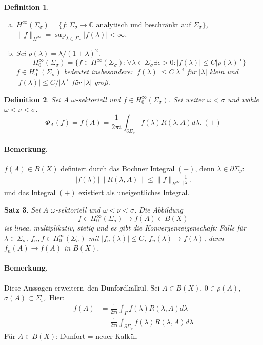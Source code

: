 \documentclass[12pt]{extreport} %
\newtheorem{Satz}{Satz}[subsection]
\newtheorem{Definition}[Satz]{Definition}
\numberwithin{equation}{section}
\newcommand{\C}{\mathbb{C}} %
\newcommand{\om}{\omega}
\begin{document}
	\begin{Definition}
		~
		\begin{enumerate}[a)]
			\item $H^{\infty}(\Sigma_\sigma) = \{f\colon \Sigma_\sigma\rightarrow \C \text{ analytisch und beschränkt auf }\Sigma_\sigma \}$, $\|f\|_{H^\infty} = \sup_{\lambda\in \Sigma_\sigma} |f(\lambda)| <\infty$.
			\item Sei $\rho(\lambda) = \lambda/(1+\lambda)^2$. 
			$$H_0^\infty(\Sigma_\sigma) = \{f\in H^\infty(\Sigma_\sigma)\colon \forall \lambda \in \Sigma_\sigma \exists \epsilon >0\colon |f(\lambda)|\leq C|\rho(\lambda)|^\epsilon \}$$
			$f\in H_0^\infty(\Sigma_\sigma)$ bedeutet insbesondere:
			$|f(\lambda)|\leq C|\lambda|^\epsilon$ für $|\lambda|$ klein und $|f(\lambda)|\leq C/|\lambda|^\epsilon$ für $|\lambda|$ groß.
		\end{enumerate}
	\end{Definition}
	
	\begin{Definition}
		Sei $A$ $\om$-sektoriell und $f\in H_0^\infty(\Sigma_\sigma)$. Sei weiter $\om < \sigma$ und wähle $\om<\nu<\sigma$.
		$$\Phi_A(f) = f(A) = \frac{1}{2\pi i}\int_{\partial \Sigma_\nu} f(\lambda) R(\lambda,A) d\lambda. ~ (+)$$
	\end{Definition}
	
	\paragraph{Bemerkung.} $f(A)\in B(X)$ definiert durch das Bochner Integral $(+)$, denn $\lambda\in \partial \Sigma_\nu$: 
	\begin{align*}
		|f(\lambda)| \|R(\lambda, A)\|\leq \|f\|_{H^{\infty}} \frac{1}{|\lambda|}.
	\end{align*}
	und das Integral $(+)$ existiert als uneigentliches Integral.
	
	\begin{Satz}
		Sei $A$ $\om$-sektoriell und $\om<\nu<\sigma$. Die Abbildung 
		$$f\in H_0^{\infty}(\Sigma_\sigma)\rightarrow f(A)\in B(X)$$ ist linea, multiplikativ, stetig und es gibt die Konvergenzeigenschaft: Falls für $\lambda\in \Sigma_\sigma$, $f_n,f\in H_0^{\infty}(\Sigma_\sigma)$ mit $|f_n(\lambda)|\leq C$, $f_n(\lambda)\rightarrow f(\lambda)$, dann $f_n(A)\rightarrow f(A)$ in $B(X)$.
	\end{Satz}
	
	\paragraph{Bemerkung.} Diese Aussagen \glqq erweitern\grqq\ den Dunfordkalkül. Sei $A\in B(X)$, $0\in \rho(A)$, $\sigma(A)\subset \Sigma_\om$. Hier:
	\begin{align*}
		f(A) &=\frac{1}{2\pi i} \int_{\Gamma} f(\lambda) R(\lambda, A) d\lambda\\
		&= \frac{1}{2\pi i} \int_{\partial \Sigma_\nu} f(\lambda) R(\lambda, A) d\lambda
	\end{align*}
	Für $A\in B(X)$: Dunfort = neuer Kalkül.
	
\end{document}
